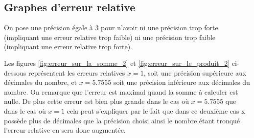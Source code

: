 \documentclass{article}
\begin{document}
\subsection*{Graphes d'erreur relative}

On pose une précision égale à 3 pour n'avoir ni une précision trop forte (impliquant une erreur relative trop faible) ni une précision trop faible (impliquant une erreur relative trop forte).

Les figures \ref{fig:erreur_sur_la_somme_2} et \ref{fig:erreur_sur_le_produit_2} ci-dessous représentent les erreurs relatives ${x = 1}$, soit une précision supérieure aux décimales du nombre, et ${x = 5.7555}$ soit une précision inférieure aux décimales du nombre. On remarque que l'erreur est maximal quand la somme à calculer est nulle. De plus cette erreur est bien plus grande dans le cas où ${x=5.7555}$ que dans le cas où ${x=1}$ cela peut s'expliquer par le fait que dans ce deuxième cas x possède plus de décimales que la précision choisi ainsi le nombre étant tronqué l'erreur relative en sera donc augmentée. 
\end{document}
